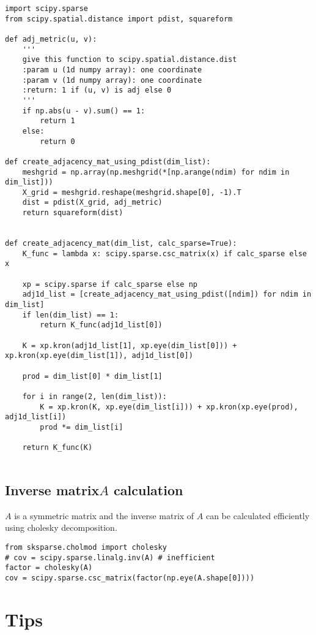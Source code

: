 \documentclass[platex, a4paper]{jsarticle}
\begin{document}
\begin{lstlisting}[basicstyle=\ttfamily\footnotesize, frame=single]
import scipy.sparse
from scipy.spatial.distance import pdist, squareform

def adj_metric(u, v):
    '''
    give this function to scipy.spatial.distance.dist
    :param u (1d numpy array): one coordinate
    :param v (1d numpy array): one coordinate
    :return: 1 if (u, v) is adj else 0
    '''
    if np.abs(u - v).sum() == 1:
        return 1
    else:
        return 0

def create_adjacency_mat_using_pdist(dim_list):
    meshgrid = np.array(np.meshgrid(*[np.arange(ndim) for ndim in dim_list]))
    X_grid = meshgrid.reshape(meshgrid.shape[0], -1).T
    dist = pdist(X_grid, adj_metric)
    return squareform(dist)


def create_adjacency_mat(dim_list, calc_sparse=True):
    K_func = lambda x: scipy.sparse.csc_matrix(x) if calc_sparse else x

    xp = scipy.sparse if calc_sparse else np
    adj1d_list = [create_adjacency_mat_using_pdist([ndim]) for ndim in dim_list]
    if len(dim_list) == 1:
        return K_func(adj1d_list[0])

    K = xp.kron(adj1d_list[1], xp.eye(dim_list[0])) + xp.kron(xp.eye(dim_list[1]), adj1d_list[0])

    prod = dim_list[0] * dim_list[1]

    for i in range(2, len(dim_list)):
        K = xp.kron(K, xp.eye(dim_list[i])) + xp.kron(xp.eye(prod), adj1d_list[i])
        prod *= dim_list[i]

    return K_func(K)


\end{lstlisting}

\subsection{Inverse matrix$A$ calculation }
$A$ is a symmetric matrix and the inverse matrix of $A$ can be calculated efficiently using cholesky decomposition.

\begin{lstlisting}[basicstyle=\ttfamily\footnotesize, frame=single]
from sksparse.cholmod import cholesky
# cov = scipy.sparse.linalg.inv(A) # inefficient
factor = cholesky(A)
cov = scipy.sparse.csc_matrix(factor(np.eye(A.shape[0])))
\end{lstlisting}

\section{Tips}
\end{document}

